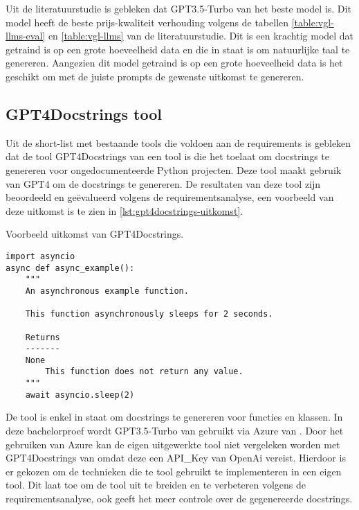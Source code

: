 Uit de literatuurstudie is gebleken dat GPT3.5-Turbo van \textcite{OpenAi2024} het beste model is. 
Dit model heeft de beste prijs-kwaliteit verhouding volgens de tabellen \ref{table:vgl-llms-eval} en \ref{table:vgl-llms} van de literatuurstudie.
Dit is een krachtig model dat getraind is op een grote hoeveelheid data en die in staat is om natuurlijke taal te genereren.
Aangezien dit model getraind is op een grote hoeveelheid data is het geschikt om met de juiste prompts de gewenste uitkomst te genereren.


\subsection{GPT4Docstrings tool}
\label{sec:bestanddocumentatie-tool}
Uit de short-list met bestaande tools die voldoen aan de requirements is gebleken dat de tool GPT4Docstrings van \textcite{Trofficus2023} een tool is die het toelaat om docstrings te genereren voor ongedocumenteerde Python projecten.
Deze tool maakt gebruik van GPT4 \autocite{OpenAI2023} om de docstrings te genereren.
De resultaten van deze tool zijn beoordeeld en geëvalueerd volgens de requirementsanalyse, een voorbeeld van deze uitkomst is te zien in \ref{lst:gpt4docstrings-uitkomst}.

\begin{listing}
    \caption{Voorbeeld uitkomst van GPT4Docstrings. \autocite{Trofficus2023}}
    \label{lst:gpt4docstrings-uitkomst}
    \begin{verbatim}
import asyncio
async def async_example():
    """
    An asynchronous example function.

    This function asynchronously sleeps for 2 seconds.

    Returns
    -------
    None
        This function does not return any value.
    """
    await asyncio.sleep(2)
    \end{verbatim}
\end{listing}

De tool is enkel in staat om docstrings te genereren voor functies en klassen.
In deze bachelorproef wordt GPT3.5-Turbo van \textcite{OpenAi2024} gebruikt via Azure van \textcite{Microsoft2024}.
Door het gebruiken van Azure kan de eigen uitgewerkte tool niet vergeleken worden met GPT4Docstrings van \textcite{Trofficus2023} omdat deze een API_Key van OpenAi \autocite{OpenAi2024} vereist.
Hierdoor is er gekozen om de technieken die te tool gebruikt te implementeren in een eigen tool.
Dit laat toe om de tool uit te breiden en te verbeteren volgens de requirementsanalyse, ook geeft het meer controle over de gegenereerde docstrings.

